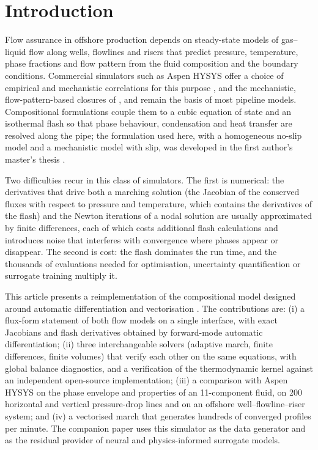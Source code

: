 \documentclass[a4paper,fleqn]{cas-sc}
\begin{document}
\section{Introduction}\label{sec:intro}

Flow assurance in offshore production depends on steady-state models of gas--liquid flow along wells, flowlines and risers that predict pressure, temperature, phase fractions and flow pattern from the fluid composition and the boundary conditions. Commercial simulators such as Aspen HYSYS \citep{aspenhysys} offer a choice of empirical and mechanistic correlations for this purpose \citep{beggs1973,aziz1972,mandhane1974,zhang2003}, and the mechanistic, flow-pattern-based closures of \citet{taitel1976,taitel1980}, \citet{xiao1990} and \citet{gomez2000} remain the basis of most pipeline models. Compositional formulations couple them to a cubic equation of state \citep{peng1976} and an isothermal flash \citep{michelsen1982a,michelsen1982b} so that phase behaviour, condensation and heat transfer are resolved along the pipe; the formulation used here, with a homogeneous no-slip model and a mechanistic model with slip, was developed in the first author's master's thesis \citep{carvalho2022}.

Two difficulties recur in this class of simulators. The first is numerical: the derivatives that drive both a marching solution (the Jacobian of the conserved fluxes with respect to pressure and temperature, which contains the derivatives of the flash) and the Newton iterations of a nodal solution are usually approximated by finite differences, each of which costs additional flash calculations and introduces noise that interferes with convergence where phases appear or disappear. The second is cost: the flash dominates the run time, and the thousands of evaluations needed for optimisation, uncertainty quantification or surrogate training multiply it.

This article presents a reimplementation of the compositional model designed around automatic differentiation and vectorisation \citep{jax2018}. The contributions are: (i) a flux-form statement of both flow models on a single interface, with exact Jacobians and flash derivatives obtained by forward-mode automatic differentiation; (ii) three interchangeable solvers (adaptive march, finite differences, finite volumes) that verify each other on the same equations, with global balance diagnostics, and a verification of the thermodynamic kernel against an independent open-source implementation; (iii) a comparison with Aspen HYSYS on the phase envelope and properties of an 11-component fluid, on 200 horizontal and vertical pressure-drop lines and on an offshore well--flowline--riser system; and (iv) a vectorised march that generates hundreds of converged profiles per minute. The companion paper \citep{carvalho2026b} uses this simulator as the data generator and as the residual provider of neural and physics-informed surrogate models.
\end{document}

